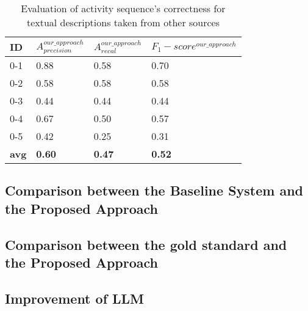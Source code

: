 \begin{table}[]
\caption{\centering Evaluation of activity sequence's correctness for textual descriptions taken from other sources}
\label{table:eva_seq_02}
\begin{tabular}{|l|l|l|l|}
\hline
\textbf{ID}  & $A^{our\_approach}_{precision}$ & $A^{our\_approach}_{recal}$  &   $F_1-score^{our\_approach}$    \\ \hline
0-1 & 0.88 & 0.58 & 0.70 \\ \hline
0-2 & 0.58 & 0.58 & 0.58 \\ \hline
0-3 & 0.44 & 0.44 & 0.44 \\ \hline
0-4 & 0.67 & 0.50 & 0.57 \\ \hline
0-5 & 0.42 & 0.25 & 0.31 \\ \hline
\textbf{avg} & \textbf{0.60} & \textbf{0.47} & \textbf{0.52}  \\ \hline
\end{tabular}
\end{table}
\subsection{Comparison between the Baseline System and the Proposed Approach}
\subsection{Comparison between the gold standard and the Proposed Approach}
\subsection{Improvement of LLM}
















































































